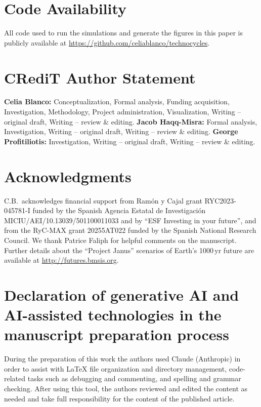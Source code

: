 




\maketitle









\section*{Code Availability}
All code used to run the simulations and generate the figures in this paper is publicly available at \url{https://github.com/celiablanco/technocycles}.

\section*{CRediT Author Statement}
\textbf{Celia Blanco:} Conceptualization, Formal analysis, Funding acquisition, Investigation, Methodology, Project administration, Visualization, Writing -- original draft, Writing -- review \& editing.
\textbf{Jacob Haqq-Misra:} Formal analysis, Investigation, Writing -- original draft, Writing -- review \& editing.
\textbf{George Profitiliotis:} Investigation, Writing -- original draft, Writing -- review \& editing.

\section*{Acknowledgments}
C.B.\ acknowledges financial support from Ram\'{o}n y Cajal grant RYC2023-045781-I funded by the Spanish Agencia Estatal de Investigaci\'{o}n MICIU/AEI/10.13039/501100011033 and by ``ESF Investing in your future'', and from the RyC-MAX grant 20255AT022 funded by the Spanish National Research Council. We thank Patrice Faliph for helpful comments on the manuscript. Further details about the ``Project Janus'' scenarios of Earth's 1000\,yr future are available at \url{http://futures.bmsis.org}.

\section*{Declaration of generative AI and AI-assisted technologies in the manuscript preparation process}
During the preparation of this work the authors used Claude (Anthropic) in order to assist with \LaTeX{} file organization and directory management, code-related tasks such as debugging and commenting, and spelling and grammar checking. After using this tool, the authors reviewed and edited the content as needed and take full responsibility for the content of the published article.





